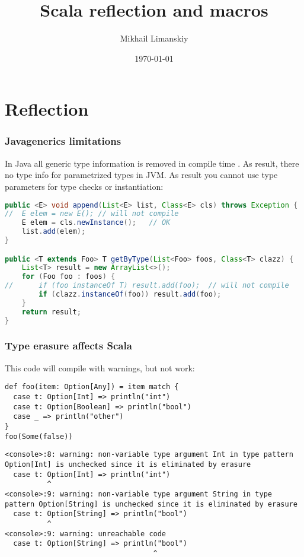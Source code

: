 \documentclass{beamer}
\title{Scala reflection and macros}
\author{Mikhail Limanskiy}
\institute{SymphonyTeleca}
\date{\today}
\begin{document}
\begin{frame}
    \titlepage
\end{frame}

\section{Reflection}

\begin{frame}[fragile]
\frametitle{Java\texttrademark generics limitations}

In Java all generic type information is removed in compile time \cite{erasure}.  As result, there no type info for
parametrized types in JVM.  As result you cannot use type parameters for type checks or instantiation:

\begin{lstlisting}[language=Java]
public <E> void append(List<E> list, Class<E> cls) throws Exception {
//  E elem = new E(); // will not compile
    E elem = cls.newInstance();   // OK
    list.add(elem);
}

public <T extends Foo> T getByType(List<Foo> foos, Class<T> clazz) {
    List<T> result = new ArrayList<>();
    for (Foo foo : foos) {
//      if (foo instanceOf T) result.add(foo);  // will not compile
        if (clazz.instanceOf(foo)) result.add(foo);
    }
    return result;
}
\end{lstlisting}
\end{frame}

\begin{frame}[fragile]
\frametitle{Type erasure affects Scala}
This code will compile with warnings, but not work:
\begin{lstlisting}
def foo(item: Option[Any]) = item match {
  case t: Option[Int] => println("int")
  case t: Option[Boolean] => println("bool")
  case _ => println("other")
}
foo(Some(false))
\end{lstlisting}
\begin{lstlisting}[breaklines=true]
<console>:8: warning: non-variable type argument Int in type pattern Option[Int] is unchecked since it is eliminated by erasure
  case t: Option[Int] => println("int")
          ^
<console>:9: warning: non-variable type argument String in type pattern Option[String] is unchecked since it is eliminated by erasure
  case t: Option[String] => println("bool")
          ^
<console>:9: warning: unreachable code
  case t: Option[String] => println("bool")
                                   ^
\end{lstlisting}
\end{frame}
\end{document}
